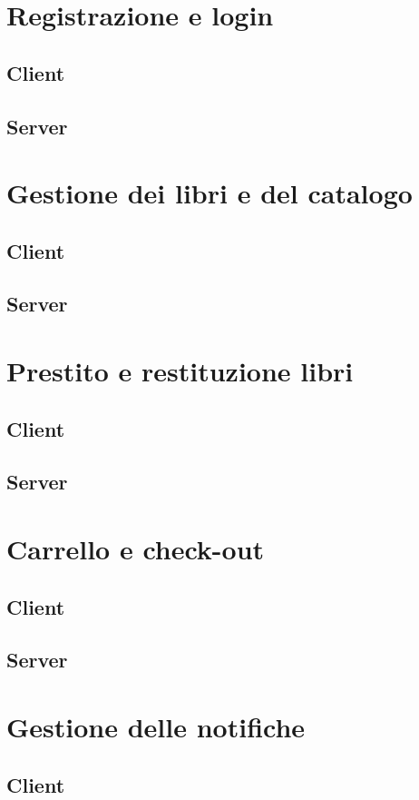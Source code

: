 \documentclass[]{report}
\begin{document}
\section{Registrazione e login}
\subsection*{Client}
\subsection*{Server}

\section{Gestione dei libri e del catalogo}
\subsection*{Client}
\subsection*{Server}

\section{Prestito e restituzione libri}
\subsection*{Client}
\subsection*{Server}

\section{Carrello e check-out}
\subsection*{Client}
\subsection*{Server}

\section{Gestione delle notifiche}
\subsection*{Client}
\end{document}
